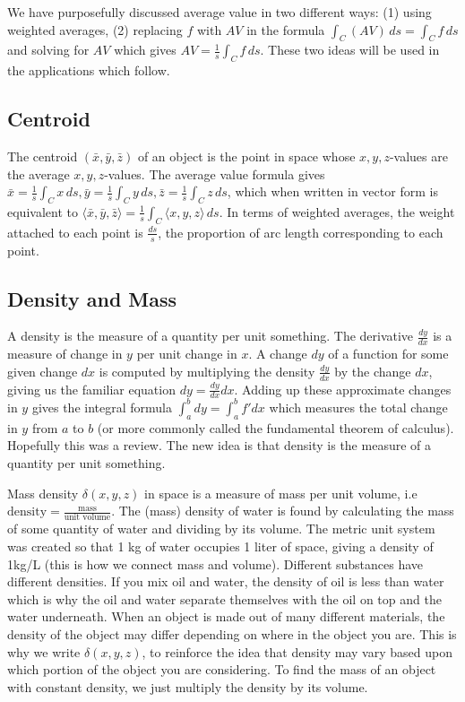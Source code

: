 \bigskip

We have purposefully discussed average value in two different ways:
(1) using weighted averages, (2) replacing $f$ with $AV$ in the
formula $\int_C (AV) \,ds = \int_C f \,ds$ and solving for $AV$ which gives
$AV=\frac{1}{s}\int_C f \,ds$.  These two ideas will be used in the
applications which follow. 

\subsection{Centroid}
The centroid $(\bar x,\bar y,\bar z)$ of an object is the point in
space whose {$x,y,z$}-values are the average {$x,y,z$}-values.  The
average value formula gives $\bar x = \frac{1}{s}\int_C x\,ds, \bar y =
\frac{1}{s}\int_C y\,ds, \bar z = \frac{1}{s}\int_C z\,ds$, which when written
in vector form is equivalent to $ \langle\bar x,\bar y,\bar z\rangle =
\frac{1}{s}\int_C  \langle x,y,z\rangle \,ds$. In terms of weighted averages,
the weight attached to each point is $\frac{ds}{s}$, the proportion of
arc length corresponding to each point.

\subsection{Density and Mass}
%
A density is the measure of a quantity per unit something. The
derivative $\frac{dy}{dx}$ is a measure of change in $y$ per unit
change in $x$. A change $dy$ of a function for some given change $dx$
is computed by multiplying the density $\frac{dy}{dx}$ by the change
$dx$, giving us the familiar equation $dy = \frac{dy}{dx}dx$. Adding
up these approximate changes in $y$ gives the integral formula $\int_a^b
dy = \int_a^b f' dx$ which measures the total change in $y$ from $a$ to
$b$ (or more commonly called the fundamental theorem of calculus). 
Hopefully this was a review. The new idea is that density is the
measure of a quantity per unit something.

Mass density $\delta(x,y,z)$ in space is a measure of mass per unit volume,
i.e $\text{density}=\frac{\text{mass}}{\text{unit volume}}$. The
(mass) density of water is found by calculating the mass of some
quantity of water and dividing by its volume. The metric unit system
was created so that 1 kg of water occupies 1 liter of space, giving a
density of 1kg/L (this is how we connect mass and volume). Different
substances have different densities.  If you mix oil and water, the
density of oil is less than water which is why the oil and water
separate themselves with the oil on top and the water underneath.
When an object is made out of many different materials, the density of
the object may differ depending on where in the object you are.  This
is why we write $\delta(x,y,z)$, to reinforce the idea that density may
vary based upon which portion of the object you are considering.  To
find the mass of an object with constant density, we just multiply the
density by its volume.

